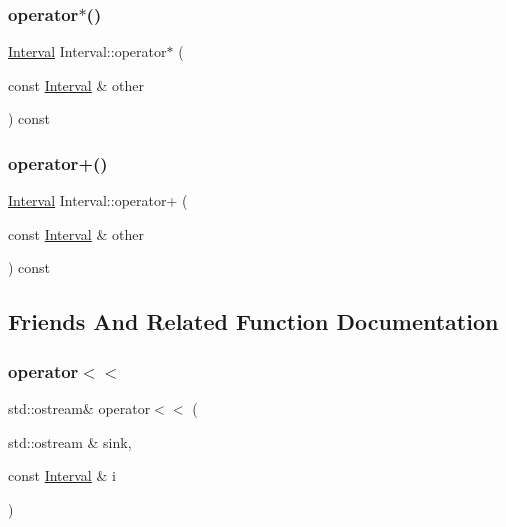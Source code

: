 \mbox{\label{classInterval_aba632e788297e13c87edf078312d38b2}} 
\subsubsection{\texorpdfstring{operator$\ast$()}{operator*()}}
{\footnotesize\ttfamily \mbox{\hyperlink{classInterval}{Interval}} Interval\+::operator$\ast$ (\begin{DoxyParamCaption}\item[{const \mbox{\hyperlink{classInterval}{Interval}} \&}]{other }\end{DoxyParamCaption}) const}

\mbox{\label{classInterval_a63d00f59b958c3c0c126daceb3479a97}} 
\subsubsection{\texorpdfstring{operator+()}{operator+()}}
{\footnotesize\ttfamily \mbox{\hyperlink{classInterval}{Interval}} Interval\+::operator+ (\begin{DoxyParamCaption}\item[{const \mbox{\hyperlink{classInterval}{Interval}} \&}]{other }\end{DoxyParamCaption}) const}



\subsection{Friends And Related Function Documentation}
\mbox{\label{classInterval_a7057e2823f722cd67f45b53382173b9f}} 
\subsubsection{\texorpdfstring{operator$<$$<$}{operator<<}}
{\footnotesize\ttfamily std\+::ostream\& operator$<$$<$ (\begin{DoxyParamCaption}\item[{std\+::ostream \&}]{sink,  }\item[{const \mbox{\hyperlink{classInterval}{Interval}} \&}]{i }\end{DoxyParamCaption})\hspace{0.3cm}{\ttfamily [friend]}}



